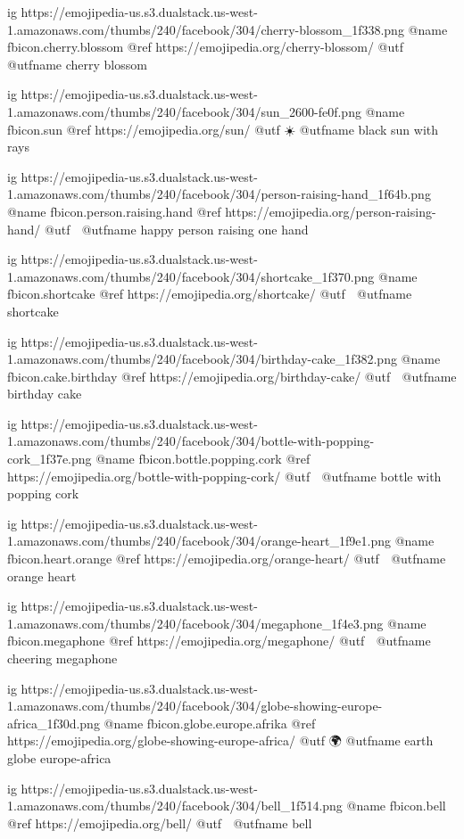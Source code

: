  ig https://emojipedia-us.s3.dualstack.us-west-1.amazonaws.com/thumbs/240/facebook/304/cherry-blossom_1f338.png
  @name fbicon.cherry.blossom
  @ref https://emojipedia.org/cherry-blossom/
  @utf 🌸
  @utfname cherry blossom

  ig https://emojipedia-us.s3.dualstack.us-west-1.amazonaws.com/thumbs/240/facebook/304/sun_2600-fe0f.png
  @name fbicon.sun
  @ref https://emojipedia.org/sun/
  @utf ☀️
  @utfname black sun with rays

  ig https://emojipedia-us.s3.dualstack.us-west-1.amazonaws.com/thumbs/240/facebook/304/person-raising-hand_1f64b.png
  @name fbicon.person.raising.hand
  @ref https://emojipedia.org/person-raising-hand/
  @utf 🙋
  @utfname happy person raising one hand

  ig https://emojipedia-us.s3.dualstack.us-west-1.amazonaws.com/thumbs/240/facebook/304/shortcake_1f370.png
  @name fbicon.shortcake
  @ref https://emojipedia.org/shortcake/
  @utf 🍰
  @utfname shortcake

  ig https://emojipedia-us.s3.dualstack.us-west-1.amazonaws.com/thumbs/240/facebook/304/birthday-cake_1f382.png
  @name fbicon.cake.birthday
  @ref https://emojipedia.org/birthday-cake/
  @utf 🎂
  @utfname birthday cake

  ig https://emojipedia-us.s3.dualstack.us-west-1.amazonaws.com/thumbs/240/facebook/304/bottle-with-popping-cork_1f37e.png
  @name fbicon.bottle.popping.cork
  @ref https://emojipedia.org/bottle-with-popping-cork/
  @utf 🍾
  @utfname bottle with popping cork

  ig https://emojipedia-us.s3.dualstack.us-west-1.amazonaws.com/thumbs/240/facebook/304/orange-heart_1f9e1.png
  @name fbicon.heart.orange
  @ref https://emojipedia.org/orange-heart/
  @utf 🧡
  @utfname orange heart

  ig https://emojipedia-us.s3.dualstack.us-west-1.amazonaws.com/thumbs/240/facebook/304/megaphone_1f4e3.png
  @name fbicon.megaphone
  @ref https://emojipedia.org/megaphone/
  @utf 📣
  @utfname cheering megaphone

  ig https://emojipedia-us.s3.dualstack.us-west-1.amazonaws.com/thumbs/240/facebook/304/globe-showing-europe-africa_1f30d.png
  @name fbicon.globe.europe.afrika
  @ref https://emojipedia.org/globe-showing-europe-africa/
  @utf 🌍
  @utfname earth globe europe-africa

  ig https://emojipedia-us.s3.dualstack.us-west-1.amazonaws.com/thumbs/240/facebook/304/bell_1f514.png
  @name fbicon.bell
  @ref https://emojipedia.org/bell/
  @utf 🔔
  @utfname bell

